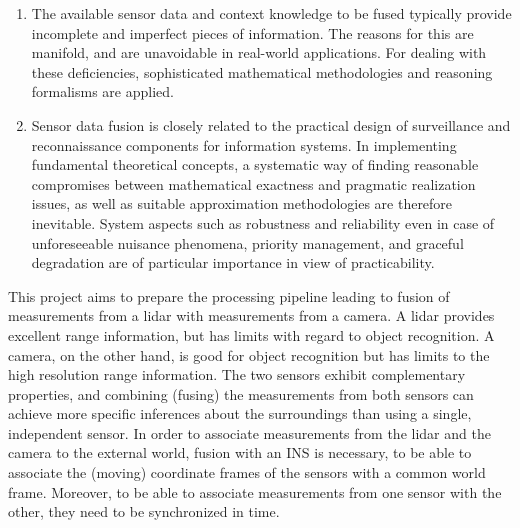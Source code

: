\begin{enumerate}
    \item The available sensor data and context knowledge to be fused typically provide incomplete and imperfect pieces of information. The reasons for this are manifold, and are unavoidable in real-world applications. For dealing with these deficiencies, sophisticated mathematical methodologies and reasoning formalisms are applied.
    \item Sensor data fusion is closely related to the practical design of surveillance and reconnaissance components for information systems. In implementing fundamental theoretical concepts, a systematic way of finding reasonable compromises between mathematical exactness and pragmatic realization issues, as well as suitable approximation methodologies are therefore inevitable. System aspects such as robustness and reliability even in case of unforeseeable nuisance phenomena, priority management, and graceful degradation are of particular importance in view of practicability.
\end{enumerate}This project aims to prepare the processing pipeline leading to fusion of measurements from a lidar with measurements from a camera. A lidar provides excellent range information, but has limits with regard to object recognition. A camera, on the other hand, is good for object recognition but has limits to the high resolution range information. The two sensors exhibit complementary properties, and combining (fusing) the measurements from both sensors can achieve more specific inferences about the surroundings than using a single, independent sensor. In order to associate measurements from the lidar and the camera to the external world, fusion with an INS is necessary, to be able to associate the (moving) coordinate frames of the sensors with a common world frame. Moreover, to be able to associate measurements from one sensor with the other, they need to be synchronized in time.
